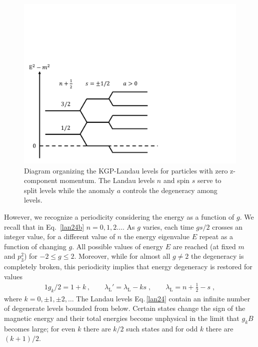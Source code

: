 \begin{figure}
 \centering
 \includegraphics[clip, trim=0.0cm 0.0cm 9.0cm 7.0cm,width=0.6\linewidth]{plots/chap02moment/lanplot04.pdf}
 \caption[]{Diagram organizing the KGP-Landau levels for particles with zero z-component momentum. The Landau levels $n$ and spin $s$ serve to split levels while the anomaly $a$ controls the degeneracy among levels.}
 \label{f04}
\end{figure}

However, we recognize a periodicity considering the energy as a function of $g$. We recall that in Eq.~\eqref{lan24b} $n=0, 1, 2\ldots$. As $g$ varies, each time $gs/2$ crosses an integer value, for a different value of $n$ the energy eigenvalue $E$ repeat as a function of changing $g$. All possible values of energy $E$ are reached (at fixed $m$ and $p^2_3$) for $-2\le g\le 2$. Moreover, while for almost all $g\ne 2$ the degeneracy is completely broken, this periodicity implies that energy degeneracy is restored for values~\cite{Evans:2022ygl,Evans:2022fsu} 
\begin{alignat}{1}
\label{lan26}
g_{k}/2=1+k\,,\qquad
\lambda_\mathrm{L}'=\lambda_\mathrm{L}-ks\;,\qquad
\lambda_\mathrm{L}=n+\frac{1}{2}-s\;,
\end{alignat}
where $k=0,\pm1,\pm2,\ldots$ The Landau levels Eq.\,\eqref{lan24} contain an infinite number of degenerate levels bounded from below. Certain states change the sign of the magnetic energy and their total energies become unphysical in the limit that $g_{k}B$ becomes large; for even $k$ there are $k/2$ such states and for odd $k$ there are $(k+1)/2$.

